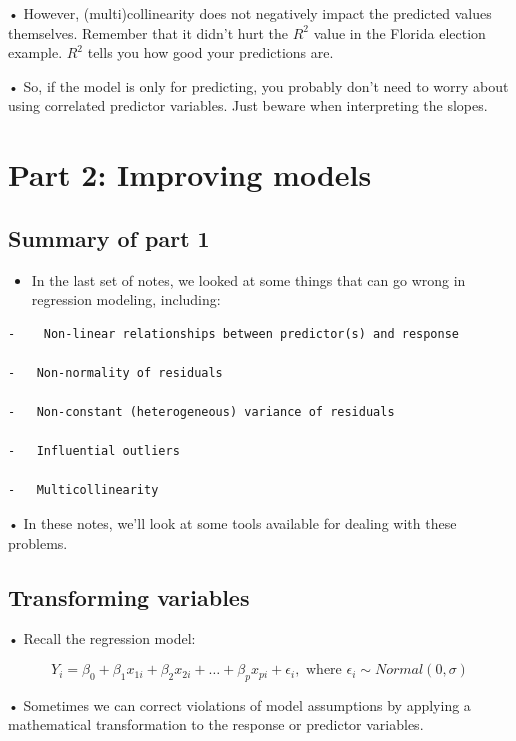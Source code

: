 \documentclass[
  letterpaper,
  DIV=11,
  numbers=noendperiod]{scrreprt}
\providecommand{\tightlist}{%
  \setlength{\itemsep}{0pt}\setlength{\parskip}{0pt}}\usepackage{longtable,booktabs,array}
\begin{document}
• However, (multi)collinearity does not negatively impact the predicted
values themselves. Remember that it didn't hurt the \(R^2\) value in the
Florida election example. \(R^2\) tells you how good your predictions
are.

• So, if the model is only for predicting, you probably don't need to
worry about using correlated predictor variables. Just beware when
interpreting the slopes.

\hypertarget{part-2-improving-models}{%
\section{Part 2: Improving models}\label{part-2-improving-models}}

\hypertarget{summary-of-part-1}{%
\subsection{Summary of part 1}\label{summary-of-part-1}}

\begin{itemize}
\tightlist
\item
  In the last set of notes, we looked at some things that can go wrong
  in regression modeling, including:
\end{itemize}

\begin{verbatim}
-    Non-linear relationships between predictor(s) and response

-   Non-normality of residuals

-   Non-constant (heterogeneous) variance of residuals

-   Influential outliers

-   Multicollinearity
\end{verbatim}

• In these notes, we'll look at some tools available for dealing with
these problems.

\hypertarget{transforming-variables}{%
\subsection{Transforming variables}\label{transforming-variables}}

• Recall the regression model:

\[
Y_i = \beta_0 + \beta_1x_{1i} + \beta_2x_{2i} + \dots + \beta_px_{pi} + \epsilon_i, \text{ where } \epsilon_i \sim Normal(0,\sigma)
\]

• Sometimes we can correct violations of model assumptions by applying a
mathematical transformation to the response or predictor variables.
\end{document}
